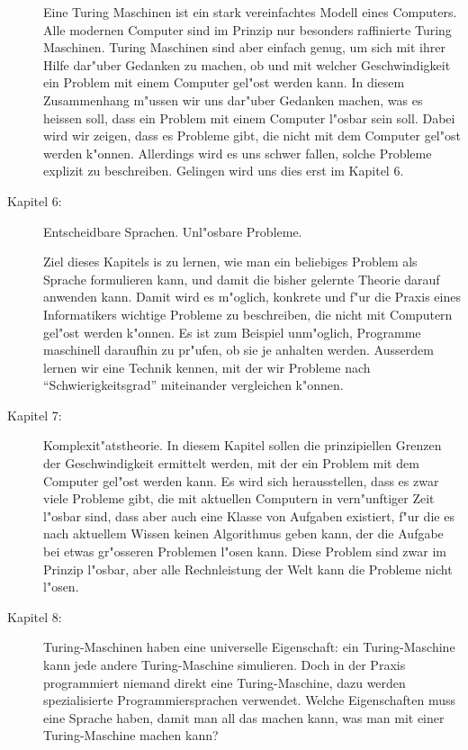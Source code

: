 \begin{description}
Eine Turing Maschinen ist ein stark vereinfachtes Modell eines Computers.
Alle modernen Computer sind im Prinzip nur besonders raffinierte Turing Maschinen.
Turing Maschinen sind aber einfach genug, um sich mit ihrer Hilfe dar"uber Gedanken
zu machen, ob und mit welcher Geschwindigkeit ein Problem mit einem
Computer gel"ost werden kann. In diesem Zusammenhang m"ussen wir uns
dar"uber Gedanken machen, was es heissen soll, dass ein Problem mit
einem Computer l"osbar sein soll. Dabei wird wir zeigen, dass es Probleme
gibt, die nicht mit dem Computer gel"ost werden k"onnen. Allerdings wird
es uns schwer fallen, solche Probleme explizit zu beschreiben. 
Gelingen wird uns dies erst im Kapitel 6.

\item[Kapitel 6:] Entscheidbare Sprachen. Unl"osbare Probleme.

Ziel dieses Kapitels is zu lernen, wie man ein beliebiges Problem als
Sprache formulieren kann, und damit die bisher gelernte Theorie darauf
anwenden kann. Damit wird es m"oglich, konkrete und f"ur die Praxis eines
Informatikers wichtige Probleme zu beschreiben, die
nicht mit Computern gel"ost werden k"onnen.
Es ist zum Beispiel unm"oglich, Programme maschinell daraufhin
zu pr"ufen, ob sie je anhalten werden.
Ausserdem lernen wir eine Technik kennen, mit der wir Probleme 
nach ``Schwierigkeitsgrad'' miteinander vergleichen k"onnen. 

\item[Kapitel 7:] Komplexit"atstheorie. In diesem Kapitel sollen 
die prinzipiellen Grenzen der Geschwindigkeit ermittelt werden,
mit der ein Problem mit dem Computer gel"ost werden kann. Es wird sich
herausstellen, dass es zwar viele Probleme gibt, die mit aktuellen Computern in
vern"unftiger Zeit l"osbar sind, dass aber auch eine Klasse von Aufgaben
existiert, f"ur die es nach aktuellem Wissen keinen Algorithmus geben kann,
der die Aufgabe bei etwas gr"osseren Problemen l"osen kann. Diese Problem sind
zwar im Prinzip l"osbar, aber alle Rechnleistung der Welt kann die Probleme nicht l"osen.

\item[Kapitel 8:]
Turing-Maschinen haben eine universelle Eigenschaft: ein Turing-Maschine
kann jede andere Turing-Maschine simulieren. Doch in der Praxis
programmiert niemand direkt eine Turing-Maschine, dazu werden
spezialisierte Programmiersprachen verwendet.
Welche Eigenschaften muss eine Sprache haben, damit
man all das machen kann, was man mit einer Turing-Maschine
machen kann?
\end{description}



